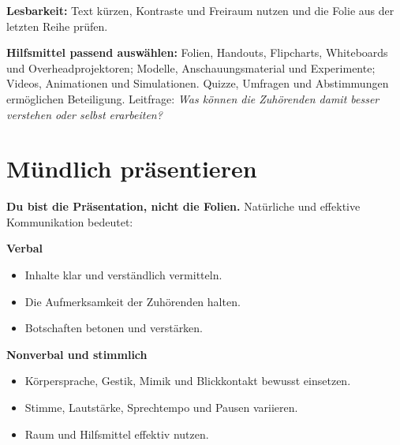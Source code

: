 \documentclass[11pt,a4paper,parskip=half]{scrartcl}
\begin{document}
\textbf{Lesbarkeit:} Text kürzen, Kontraste und Freiraum nutzen und die Folie
aus der letzten Reihe prüfen.

\textbf{Hilfsmittel passend auswählen:} Folien, Handouts, Flipcharts,
Whiteboards und Overheadprojektoren; Modelle, Anschauungsmaterial und Experimente;
Videos, Animationen und Simulationen. Quizze, Umfragen und Abstimmungen ermöglichen
Beteiligung. Leitfrage: \emph{Was können die Zuhörenden damit besser verstehen
oder selbst erarbeiten?}

\newpage
\begingroup
\setlength{\parskip}{3pt plus .5pt minus .5pt}
\section{Mündlich präsentieren}
\textbf{Du bist die Präsentation, nicht die Folien.}
Natürliche und effektive Kommunikation bedeutet:

\noindent\begin{minipage}[t]{.48\linewidth}
\textbf{Verbal}
\begin{itemize}
  \item Inhalte klar und verständlich vermitteln.
  \item Die Aufmerksamkeit der Zuhörenden halten.
  \item Botschaften betonen und verstärken.
\end{itemize}
\end{minipage}\hfill
\begin{minipage}[t]{.48\linewidth}
\textbf{Nonverbal und stimmlich}
\begin{itemize}
  \item Körpersprache, Gestik, Mimik und Blickkontakt bewusst einsetzen.
  \item Stimme, Lautstärke, Sprechtempo und Pausen variieren.
  \item Raum und Hilfsmittel effektiv nutzen.
\end{itemize}
\end{minipage}
\end{document}
